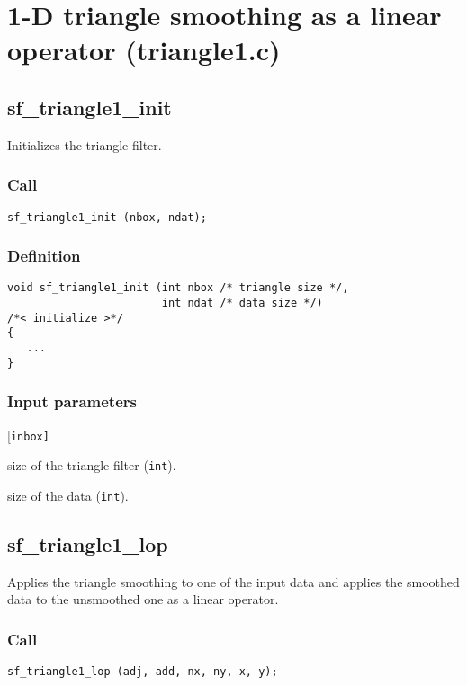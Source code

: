\section{1-D triangle smoothing as a linear operator (triangle1.c)}




\subsection{{sf\_triangle1\_init}}
Initializes the triangle filter.

\subsubsection*{Call}
\begin{verbatim}sf_triangle1_init (nbox, ndat);\end{verbatim}

\subsubsection*{Definition}
\begin{verbatim}
void sf_triangle1_init (int nbox /* triangle size */, 
                        int ndat /* data size */)
/*< initialize >*/
{
   ...
}
\end{verbatim}

\subsubsection*{Input parameters}
\begin{desclist}{\tt }{\quad}[\tt inbox]
   \setlength\itemsep{0pt}
   \item[inbox] size of the triangle filter (\texttt{int}). 
   \item[ndat]  size of the data (\texttt{int}).
\end{desclist}




\subsection{{sf\_triangle1\_lop}}\label{sec:sf_triangle1_lop}
Applies the triangle smoothing to one of the input data and applies the smoothed data to the unsmoothed one as a linear operator.


\subsubsection*{Call}
\begin{verbatim}sf_triangle1_lop (adj, add, nx, ny, x, y);\end{verbatim}

